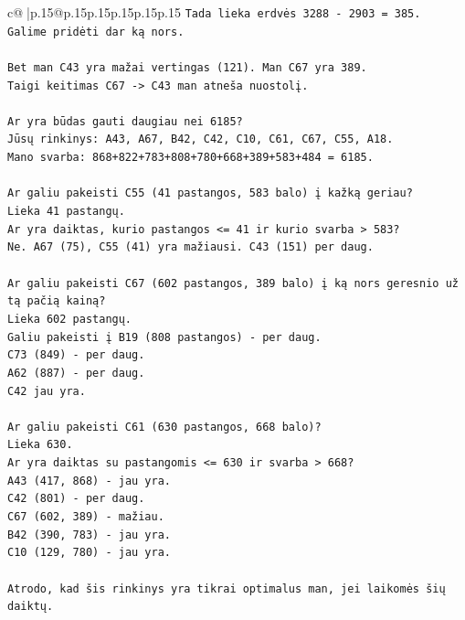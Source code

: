 \documentclass{article}
\begin{document}
{\begin{supertabular}{c@{$\;$}|p{.15\linewidth}@{}p{.15\linewidth}p{.15\linewidth}p{.15\linewidth}p{.15\linewidth}p{.15\linewidth}}
{{{\texttt{Tada lieka erdvės 3288 {-} 2903 = 385.} \\
\texttt{Galime pridėti dar ką nors.} \\
\\ 
\texttt{Bet man C43 yra mažai vertingas (121). Man C67 yra 389.} \\
\texttt{Taigi keitimas C67 {-}> C43 man atneša nuostolį.} \\
\\ 
\texttt{Ar yra būdas gauti daugiau nei 6185?} \\
\texttt{Jūsų rinkinys: A43, A67, B42, C42, C10, C61, C67, C55, A18.} \\
\texttt{Mano svarba: 868+822+783+808+780+668+389+583+484 = 6185.} \\
\\ 
\texttt{Ar galiu pakeisti C55 (41 pastangos, 583 balo) į kažką geriau?} \\
\texttt{Lieka 41 pastangų.} \\
\texttt{Ar yra daiktas, kurio pastangos <= 41 ir kurio svarba > 583?} \\
\texttt{Ne. A67 (75), C55 (41) yra mažiausi. C43 (151) per daug.} \\
\\ 
\texttt{Ar galiu pakeisti C67 (602 pastangos, 389 balo) į ką nors geresnio už tą pačią kainą?} \\
\texttt{Lieka 602 pastangų.} \\
\texttt{Galiu pakeisti į B19 (808 pastangos) {-} per daug.} \\
\texttt{C73 (849) {-} per daug.} \\
\texttt{A62 (887) {-} per daug.} \\
\texttt{C42 jau yra.} \\
\\ 
\texttt{Ar galiu pakeisti C61 (630 pastangos, 668 balo)?} \\
\texttt{Lieka 630.} \\
\texttt{Ar yra daiktas su pastangomis <= 630 ir svarba > 668?} \\
\texttt{A43 (417, 868) {-} jau yra.} \\
\texttt{C42 (801) {-} per daug.} \\
\texttt{C67 (602, 389) {-} mažiau.} \\
\texttt{B42 (390, 783) {-} jau yra.} \\
\texttt{C10 (129, 780) {-} jau yra.} \\
\\ 
\texttt{Atrodo, kad šis rinkinys yra tikrai optimalus man, jei laikomės šių daiktų.} \\
}}}
\end{supertabular}}
\end{document}
